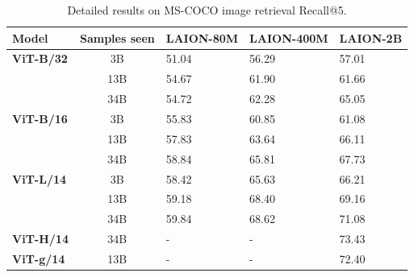 \begin{appendix}
\begin{table}[tb]
\small
\centering
\begin{tabular}{@{}lclll@{}}
\toprule
\textbf{Model}                     & \textbf{Samples seen} & \textbf{LAION-80M} & \textbf{LAION-400M} & \textbf{LAION-2B} \\ \midrule
\textbf{ViT-B/32} & 3B           & 51.04     & 56.29      & 57.01       \\
                          & 13B          & 54.67     & 61.90       & 61.66       \\
                          & 34B          & 54.72         & 62.28      &65.05        \\ \midrule
\textbf{ViT-B/16} & 3B           & 55.83     & 60.85      & 61.08       \\
                          & 13B          & 57.83     & 63.64       & 66.11       \\
                          & 34B          & 58.84         & 65.81      & 67.73        \\ \midrule                          
\textbf{ViT-L/14} & 3B           & 58.42     & 65.63      & 66.21       \\         
& 13B          & 59.18         & 68.40      & 69.16           \\
                          & 34B          & 59.84         & 68.62       & 71.08       \\ \midrule 
\textbf{ViT-H/14} & 34B           & -     & -      & 73.43       \\         \midrule 
\textbf{ViT-g/14} & 13B           & -     & -      & 72.40       \\         \bottomrule 

\end{tabular}


\caption{Detailed results on MS-COCO image retrieval Recall@5. 
}
\label{table:zeroshot_mscoco_image_retrieval}
\end{table}

\begin{table}[tb]


\end{table}
\end{appendix}

